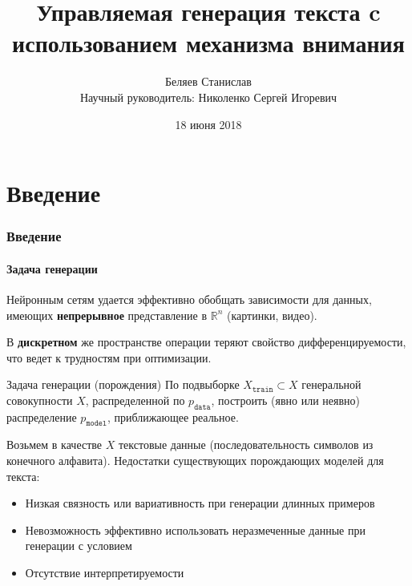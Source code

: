 \documentclass[10pt]{beamer}
\title[Управляемая генерация текста]{Управляемая генерация текста c использованием механизма внимания%
}
\author[Беляев Станислав]{
Беляев Станислав\texorpdfstring{\\ Научный руководитель: Николенко Сергей Игоревич}{}
}
\institute[СПбАУ]
{
Санкт-Петербургский Академический Университет
}
\date{18 июня 2018}
\begin{document}
\begin{frame}


\titlepage
\end{frame}
\section{Введение}
\begin{frame}
\frametitle{Введение}
\framesubtitle{Задача генерации}


Нейронным сетям удается эффективно обобщать зависимости для данных, имеющих \textbf{непрерывное} представление в $\mathbb{R}^n$ (картинки, видео). 

В \textbf{дискретном} же пространстве операции теряют свойство дифференцируемости, что ведет к трудностям при оптимизации.

\begin{block}{Задача генерации (порождения)}
    По подвыборке $X_{\texttt{train}} \subset X$ генеральной совокупности $X$, распределенной по $p_{\texttt{data}}$, построить (явно или неявно) распределение $p_{\texttt{model}}$, приближающее реальное.
\end{block}

Возьмем в качестве $X$ текстовые данные (последовательность символов из конечного алфавита). Недостатки существующих порождающих моделей для текста:
\begin{itemize}
    \item Низкая связность или вариативность при генерации длинных примеров
    \item Невозможность эффективно использовать неразмеченные данные при генерации с условием
    \item Отсутствие интерпретируемости
\end{itemize}

\pagebreak

\end{frame}
\end{document}
